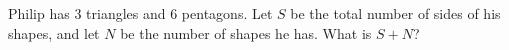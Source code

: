 Philip has $3$ triangles and $6$ pentagons. Let $S$ be the total number of sides of his shapes, and let $N$ be the number of shapes he has. What is $S+N$?
